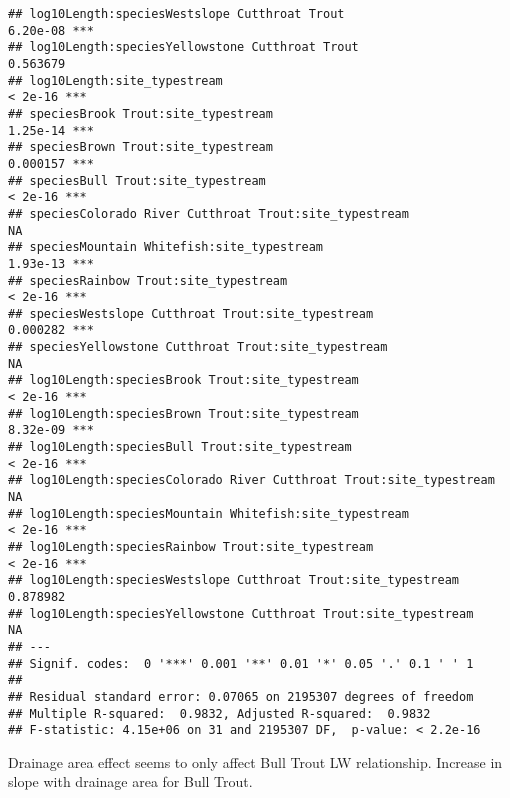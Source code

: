 \documentclass[
  landscape]{article}
\newenvironment{Shaded}{\begin{snugshade}}{\end{snugshade}}
\newcommand{\DataTypeTok}[1]{\textcolor[rgb]{0.13,0.29,0.53}{#1}}
\newcommand{\KeywordTok}[1]{\textcolor[rgb]{0.13,0.29,0.53}{\textbf{#1}}}
\newcommand{\NormalTok}[1]{#1}
\newcommand{\OperatorTok}[1]{\textcolor[rgb]{0.81,0.36,0.00}{\textbf{#1}}}
\newcommand{\StringTok}[1]{\textcolor[rgb]{0.31,0.60,0.02}{#1}}
\begin{document}
\begin{verbatim}
## log10Length:speciesWestslope Cutthroat Trout                      6.20e-08 ***
## log10Length:speciesYellowstone Cutthroat Trout                    0.563679    
## log10Length:site_typestream                                        < 2e-16 ***
## speciesBrook Trout:site_typestream                                1.25e-14 ***
## speciesBrown Trout:site_typestream                                0.000157 ***
## speciesBull Trout:site_typestream                                  < 2e-16 ***
## speciesColorado River Cutthroat Trout:site_typestream                   NA    
## speciesMountain Whitefish:site_typestream                         1.93e-13 ***
## speciesRainbow Trout:site_typestream                               < 2e-16 ***
## speciesWestslope Cutthroat Trout:site_typestream                  0.000282 ***
## speciesYellowstone Cutthroat Trout:site_typestream                      NA    
## log10Length:speciesBrook Trout:site_typestream                     < 2e-16 ***
## log10Length:speciesBrown Trout:site_typestream                    8.32e-09 ***
## log10Length:speciesBull Trout:site_typestream                      < 2e-16 ***
## log10Length:speciesColorado River Cutthroat Trout:site_typestream       NA    
## log10Length:speciesMountain Whitefish:site_typestream              < 2e-16 ***
## log10Length:speciesRainbow Trout:site_typestream                   < 2e-16 ***
## log10Length:speciesWestslope Cutthroat Trout:site_typestream      0.878982    
## log10Length:speciesYellowstone Cutthroat Trout:site_typestream          NA    
## ---
## Signif. codes:  0 '***' 0.001 '**' 0.01 '*' 0.05 '.' 0.1 ' ' 1
## 
## Residual standard error: 0.07065 on 2195307 degrees of freedom
## Multiple R-squared:  0.9832, Adjusted R-squared:  0.9832 
## F-statistic: 4.15e+06 on 31 and 2195307 DF,  p-value: < 2.2e-16
\end{verbatim}

Drainage area effect seems to only affect Bull Trout LW relationship.
Increase in slope with drainage area for Bull Trout.

\begin{Shaded}
\end{Shaded}
\end{document}
